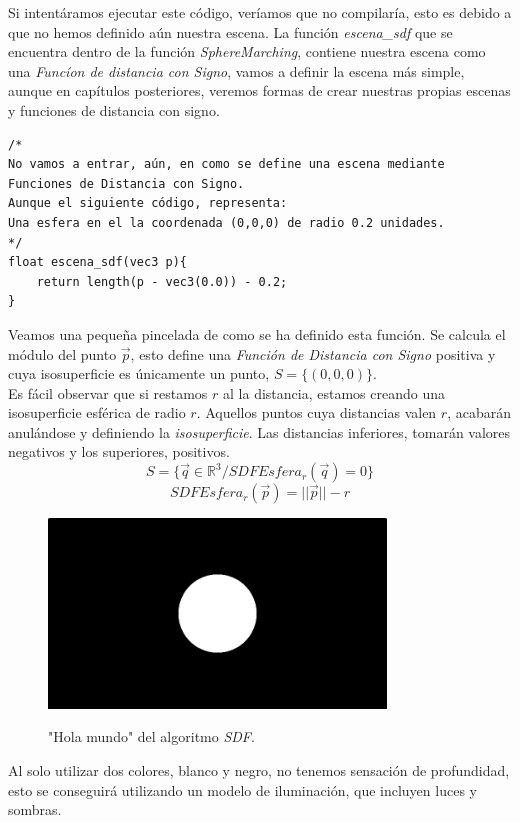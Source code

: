 \newpage
Si intentáramos ejecutar este código, veríamos que no compilaría, esto es debido a que no hemos definido aún nuestra escena. La función \textit{escena\_sdf} que se encuentra dentro de la función \textit{SphereMarching}, contiene nuestra escena como una \textit{Funcíon de distancia con Signo}, vamos a definir la escena más simple, aunque en capítulos posteriores, veremos formas de crear nuestras propias escenas y funciones de distancia con signo.
\begin{lstlisting}
/* 
No vamos a entrar, aún, en como se define una escena mediante Funciones de Distancia con Signo.
Aunque el siguiente código, representa:
Una esfera en el la coordenada (0,0,0) de radio 0.2 unidades.
*/
float escena_sdf(vec3 p){
    return length(p - vec3(0.0)) - 0.2;
}
\end{lstlisting}
Veamos una pequeña pincelada de como se ha definido esta función. Se calcula el módulo del punto \(\Vec{p}\), esto define una \textit{Función de Distancia con Signo} positiva y cuya isosuperficie es únicamente un punto, \(S=\{(0,0,0)\}\).\\Es fácil observar que si restamos \(r\) al la distancia, estamos creando una isosuperficie esférica de radio \(r\). Aquellos puntos cuya distancias valen \(r\), acabarán anulándose y definiendo la \textit{isosuperficie}. Las distancias inferiores, tomarán valores negativos y los superiores, positivos.
\[S=\{\Vec{q} \in \mathbb{R}^3 / SDFEsfera_r(\Vec{q})=0\}\]
\[ SDFEsfera_r(\Vec{p})=\vert\vert\Vec{p}\vert\vert - r  \]
\begin{figure}[H]
  \centering
  \captionsetup{justification=centering}%
  \includegraphics[width=0.8\textwidth]{secciones/imagenes/starting/sdf1.png}\label{fig:hello}
  \caption{"Hola mundo" del algoritmo \textit{SDF}.}
\end{figure}
Al solo utilizar dos colores, blanco y negro, no tenemos sensación de profundidad, esto se conseguirá utilizando un modelo de iluminación, que incluyen luces y sombras.